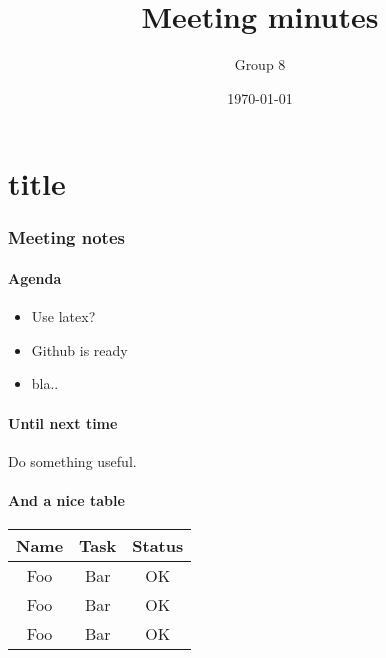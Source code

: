 \part{title}\documentclass[a4paper]{article}
\begin{document}
	\title{Meeting minutes}
	\author{Group 8}
	\date{\today}
	\maketitle

	\section{Meeting notes}
		\subsection{Agenda}
			\begin{itemize}
				\item Use latex?
				\item Github is ready
				\item bla..
			\end{itemize}
		
		\subsection{Until next time}
			Do something useful.

		\subsection{And a nice table}
			\begin{tabular}{|c|c|c|}
				\hline
				Name & Task & Status \\ 
				\hline \hline
				Foo & Bar & OK \\
				Foo & Bar & OK \\
				Foo & Bar & OK \\
				\hline
			\end{tabular}	
\end{document}
